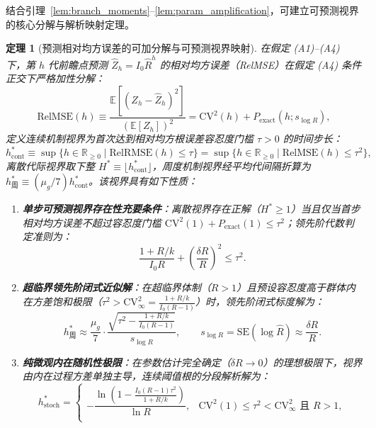 \documentclass[11pt,a4paper]{article}
\theoremstyle{plain}
\newtheorem{theorem}{定理}
\theoremstyle{definition}
\begin{document}
结合引理~\ref{lem:branch_moments}--\ref{lem:param_amplification}，可建立可预测视界的核心分解与解析映射定理。

\begin{theorem}[预测相对均方误差的可加分解与可预测视界映射]\label{thm:horizon}
在假定 (A1)--(A4) 下，第 $h$ 代前瞻点预测 $\hat{Z}_h = I_0 \hat{R}^h$ 的相对均方误差（RelMSE）在假定 (A4) 条件正交下严格加性分解：
\begin{equation}
\text{RelMSE}(h) \equiv \frac{\mathbb{E}[(Z_h - \hat{Z}_h)^2]}{(\mathbb{E}[Z_h])^2} = \text{CV}^2(h) + P_{\text{exact}}(h; s_{\log R}),
\label{eq:relmse_decomp}
\end{equation}
定义连续机制视界为首次达到相对均方根误差容忍度门槛 $\tau > 0$ 的时间步长：
\begin{equation}
h^*_{\text{cont}} \equiv \sup\{h \in \mathbb{R}_{\ge 0} \mid \text{RelRMSE}(h) \le \tau\} = \sup\{h \in \mathbb{R}_{\ge 0} \mid \text{RelMSE}(h) \le \tau^2\},
\end{equation}
离散代际视界取下整 $H^* \equiv \lfloor h^*_{\text{cont}} \rfloor$，周度机制视界经平均代间隔折算为 $h^*_{\text{周}} \equiv (\mu_g/7) h^*_{\text{cont}}$。该视界具有如下性质：
\begin{enumerate}
\item \textbf{单步可预测视界存在性充要条件}：离散视界存在正解（$H^* \ge 1$）当且仅当首步相对均方误差不超过容忍度门槛 $\text{CV}^2(1) + P_{\text{exact}}(1) \le \tau^2$；领先阶代数判定准则为：
\begin{equation}
\frac{1 + R/k}{I_0 R} + \left(\frac{\delta R}{R}\right)^2 \le \tau^2.
\label{eq:h_exist_cond}
\end{equation}
\item \textbf{超临界领先阶闭式近似解}：在超临界体制（$R > 1$）且预设容忍度高于群体内在方差饱和极限（$\tau^2 > \text{CV}^2_\infty = \frac{1+R/k}{I_0(R-1)}$）时，领先阶闭式标度解为：
\begin{equation}
h^*_{\text{周}} \approx \frac{\mu_g}{7} \cdot \frac{\sqrt{\tau^2 - \frac{1 + R/k}{I_0(R - 1)}}}{s_{\log R}}, \qquad s_{\log R} = \text{SE}(\log \hat{R}) \approx \frac{\delta R}{R}.
\label{eq:horizon_cn}
\end{equation}
\item \textbf{纯微观内在随机性极限}：在参数估计完全确定（$\delta R \to 0$）的理想极限下，视界由内在过程方差单独主导，连续阈值根的分段解析解为：
\begin{equation}
h^*_{\text{stoch}} = \begin{cases}
-\dfrac{\ln\!\left(1 - \frac{I_0(R - 1)\tau^2}{1 + R/k}\right)}{\ln R}, & \text{CV}^2(1) \le \tau^2 < \text{CV}^2_\infty \text{ 且 } R > 1, \\[5pt]

\end{cases}
\end{equation}
\end{enumerate}
\end{theorem}
\end{document}
